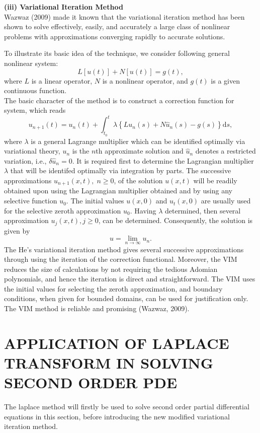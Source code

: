 \documentclass[12pt]{report}
\newcommand{\NI}{\noindent}
\newcommand{\bt}[1]{\textbf{#1}}
\begin{document}
\NI\bt{(iii) Variational Iteration Method}\\
Wazwaz (2009) made it known that the variational iteration method has been shown to solve effectively, easily, and accurately a large class of nonlinear problems with approximations converging rapidly to accurate solutions.

\NI To illustrate its basic idea of the technique, we consider following general nonlinear system:
\begin{equation}
	L[u(t)] + N[u(t)] = g(t),
\end{equation}
where $L$ is a linear operator, $N$ is a nonlinear operator, and $g(t)$ is a given continuous function.\\

\NI The basic character of the method is to construct a correction function for system, which reads
\begin{equation}
	u_{n+1}(t) = u_n(t) + \int_{t_0}^{t} \lambda\left\{Lu_n(s) + N\hat{u}_n(s) - g(s)\right\}\text{d}s,
\end{equation}
where $\lambda$ is a general Lagrange multiplier which can be identified optimally via variational theory, $u_n$ is the $n$th approximate solution and $\hat{u}_n$ denotes a restricted variation, i.e., $\delta \hat{u}_n = 0$. It is required first to determine the Lagrangian multiplier $\lambda$ that will be identifed optimally via integration by parts. The successive approximations $u_{n+1}(x,t), \; n \geq 0$, of the solution $u(x,t)$ will be readily obtained upon using the Lagrangian multiplier obtained and by using any selective function $u_0$. The initial values $u(x,0)$ and $u_t(x,0)$ are usually used for the selective zeroth approximation $u_0$. Having $\lambda$ determined, then several approximation $u_j(x,t), j\geq 0$, can be determined. Consequently, the solution is given by 
\begin{equation}
	u = \lim\limits_{n \rightarrow \infty}u_n.
\end{equation}
 The He's variational iteration method gives several successive approximations through using the iteration of the correction functional. Moreover, the VIM reduces the size of calculations by not requiring the tedious Adomian polynomials, and hence the iteration is direct and straightforward. The VIM uses the initial values for selecting the zeroth approximation, and boundary conditions, when given for bounded domains, can be used for justification only. The VIM method is reliable and promising (Wazwaz, 2009).


\chapter{APPLICATION OF LAPLACE TRANSFORM IN SOLVING SECOND ORDER PDE}
The laplace method will firstly be used to solve second order partial differential equations in this section, before introducing the new modified variational iteration method.
\end{document}
